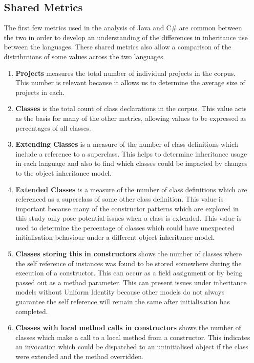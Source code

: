 \subsection{Shared Metrics}
The first few metrics used in the analysis of Java and C\# are common between the two in order to develop an understanding of the differences in inheritance use between the languages. These shared metrics also allow a comparison of the distributions of some values across the two languages.
\begin{enumerate}
	\item \textbf{Projects} measures the total number of individual projects in the corpus. This number is relevant because it allows us to determine the average size of projects in each.
	
	\item \textbf{Classes} is the total count of class declarations in the corpus. This value acts as the basis for many of the other metrics, allowing values to be expressed as percentages of all classes.
	
	\item \textbf{Extending Classes} is a measure of the number of class definitions which include a reference to a superclass. This helps to determine inheritance usage in each language and also to find which classes could be impacted by changes to the object inheritance model.
	
	\item \textbf{Extended Classes} is a measure of the number of class definitions which are referenced as a superclass of some other class definition. This value is important because many of the constructor patterns which are explored in this study only pose potential issues when a class is extended. This value is used to determine the percentage of classes which could have unexpected initialisation behaviour under a different object inheritance model.
	
	\item \textbf{Classes storing this in constructors} shows the number of classes where the self reference of instances was found to be stored somewhere during the execution of a constructor. This can occur as a field assignment or by being passed out as a method parameter. This can present issues under inheritance models without Uniform Identity because other models do not always guarantee the self reference will remain the same after initialisation has completed.
	
	\item \textbf{Classes with local method calls in constructors} shows the number of classes which make a call to a local method from a constructor. This indicates an invocation which could be dispatched to an uninitialised object if the class were extended and the method overridden.
\end{enumerate}


